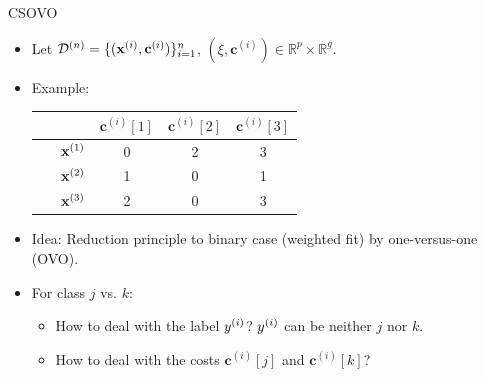 \documentclass[11pt,compress,t,notes=noshow, xcolor=table]{beamer}
\newcommand{\cv}{\mathbf{c}}
\begin{document}
\begin{frame}{CSOVO}
    

    \begin{itemize}
        \item Let $\D^{(n)} = \{(\xi, \cv^{(i)})\}_{i=1}^n$, $(\xi, \cv^{(i)}) \in \mathbb{R}^p \times \mathbb{R}^g$.  
        \item Example:

        \begin{center}
            \begin{tabular}{cc|ccc}\
        	& & $\cv^{(i)}[1]$ & $\cv^{(i)}[2]$ & $\cv^{(i)}[3]$  \\
        	\hline & $\mathbf{x}^{(1)}$ & 0 & 2 & 3\\
        	& $\mathbf{x}^{(2)}$ & 1 & 0 & 1\\
                 & $\mathbf{x}^{(3)}$ & 2 & 0 & 3\\
            \end{tabular}
        \end{center}
        
        
        \item Idea: Reduction principle to binary case (weighted fit) by one-versus-one (OVO). 
        
        
        \item For class $j$ vs. $k$:
        \begin{itemize}
            \item How to deal with the label $y^{(i)}$? $y^{(i)}$ can be neither $j$ nor $k$.
            \vspace{5pt}
            
            \item How to deal with the costs $\cv^{(i)}[j]$ and $\cv^{(i)}[k]$?
            
        \end{itemize}
            
    \end{itemize}

\end{frame}
\end{document}
